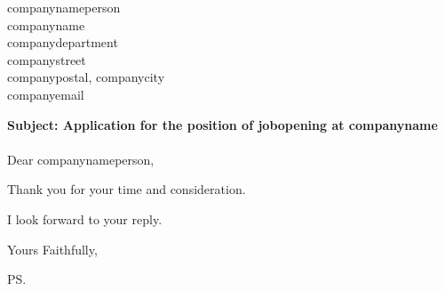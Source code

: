\documentclass{letter}
\newcommand{\letterdate}{letterdate}
\newcommand{\jobopening}{jobopening}
\newcommand{\companynameperson}{companynameperson}
\newcommand{\companyname}{companyname}
\newcommand{\companydepartment}{companydepartment}
\newcommand{\companystreet}{companystreet}
\newcommand{\companypostal}{companypostal}
\newcommand{\companycity}{companycity}
\newcommand{\companyemail}{companyemail}
\begin{document}
\begin{letter}{\companynameperson \\ \companyname \\ \companydepartment \\ \companystreet \\ \companypostal, \companycity \\ \companyemail}


	\opening{
		{\bf Subject: Application for the position of {\jobopening} at \companyname} \\ ~ \\
	          Dear \companynameperson,
	}

%	

	Thank you for your time and consideration.

	I look forward to your reply.

	\closing{Yours Faithfully,}

	\ps


\end{letter}
\end{document}
